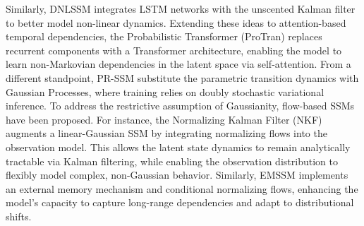\documentclass[a4paper,oneside,bibliography=totoc]{scrbook}
\begin{document}
Similarly, DNLSSM \cite{du_probabilistic_2023} integrates LSTM networks with the unscented Kalman filter \cite{julier_unscented_2004} to better model non-linear dynamics.
Extending these ideas to attention-based temporal dependencies, the Probabilistic Transformer (ProTran) \cite{tang_probabilistic_2021} replaces recurrent components with a Transformer architecture, enabling the model to learn non-Markovian dependencies in the latent space via self-attention. %
From a different standpoint, PR-SSM \cite{doerr_probabilistic_2018} substitute the parametric transition dynamics with Gaussian Processes, where training relies on doubly stochastic variational inference.
To address the restrictive assumption of Gaussianity, flow-based SSMs have been proposed. For instance, the Normalizing Kalman Filter (NKF) \cite{de_bezenac_normalizing_2020} augments a linear-Gaussian SSM by integrating normalizing flows into the observation model. This allows the latent state dynamics to remain analytically tractable via Kalman filtering, while enabling the observation distribution to flexibly model complex, non-Gaussian behavior. Similarly, EMSSM \cite{sun_memory_2022} implements an external memory mechanism and conditional normalizing flows, enhancing the model’s capacity to capture long-range dependencies and adapt to distributional shifts.
\end{document}
